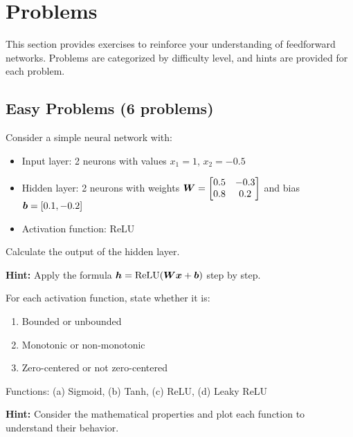 
\section{Problems }
\label{sec:problems}

This section provides exercises to reinforce your understanding of feedforward networks. Problems are categorized by difficulty level, and hints are provided for each problem.

\subsection{Easy Problems (6 problems)}

\begin{problem}
\label{prob:forward-pass}

Consider a simple neural network with:
\begin{itemize}
    \item Input layer: 2 neurons with values $x_1 = 1$, $x_2 = -0.5$
    \item Hidden layer: 2 neurons with weights $\boldsymbol{W} = \begin{bmatrix} 0.5 & -0.3 \\ 0.8 & 0.2 \end{bmatrix}$ and bias $\boldsymbol{b} = [0.1, -0.2]$
    \item Activation function: ReLU
\end{itemize}

Calculate the output of the hidden layer.

\textbf{Hint:} Apply the formula $\boldsymbol{h} = \text{ReLU}(\boldsymbol{W}\boldsymbol{x} + \boldsymbol{b})$ step by step.
\end{problem}

\begin{problem}
\label{prob:activation-properties}

For each activation function, state whether it is:
\begin{enumerate}
    \item Bounded or unbounded
    \item Monotonic or non-monotonic
    \item Zero-centered or not zero-centered
\end{enumerate}

Functions: (a) Sigmoid, (b) Tanh, (c) ReLU, (d) Leaky ReLU

\textbf{Hint:} Consider the mathematical properties and plot each function to understand their behavior.
\end{problem}

